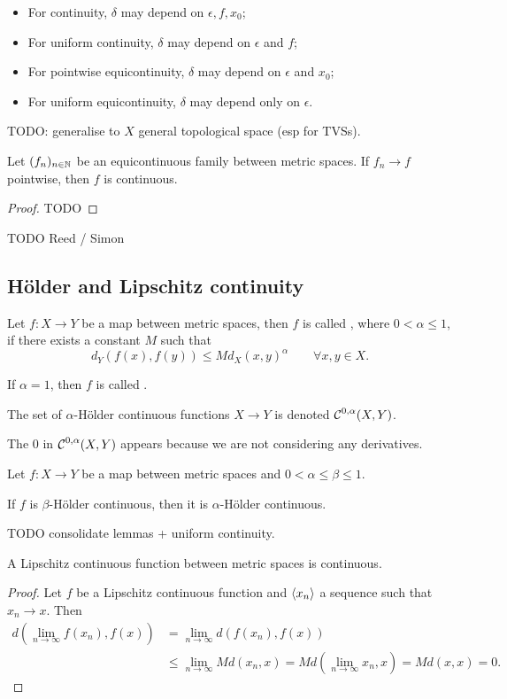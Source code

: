 \begin{itemize}
\item For continuity, $\delta$ may depend on $\epsilon,f,x_0$;
\item For uniform continuity, $\delta$ may depend on $\epsilon$ and $f$;
\item For pointwise equicontinuity, $\delta$ may depend on $\epsilon$ and $x_0$;
\item For uniform equicontinuity, $\delta$ may depend only on $\epsilon$.
\end{itemize}

TODO: generalise to $X$ general topological space (esp for TVSs).

\begin{proposition}
Let $(f_n)_{n\in\mathbb{N}}$ be an equicontinuous family between metric spaces. If $f_n\to f$ pointwise, then $f$ is continuous.
\end{proposition}
\begin{proof}
TODO
\end{proof}

TODO Reed / Simon

\subsection{Hölder and Lipschitz continuity}
\begin{definition}
Let $f: X\to Y$ be a map between metric spaces, then $f$ is called , where $0 < \alpha \leq 1$, if there exists a constant $M$ such that
\[ d_Y(f(x), f(y)) \leq M d_X(x,y)^\alpha \qquad \forall x,y\in X. \]

If $\alpha = 1$, then $f$ is called .

The set of $\alpha$-Hölder continuous functions $X\to Y$ is denoted $\operatorname{\mathcal{C}}^{0,\alpha}(X,Y)$.
\end{definition}
The $0$ in $\operatorname{\mathcal{C}}^{0,\alpha}(X,Y)$ appears because we are not considering any derivatives.

\begin{lemma} \label{HolderLipschitzContinuity}
Let $f: X\to Y$ be a map between metric spaces and $0<\alpha \leq \beta \leq 1$.

If $f$ is $\beta$-Hölder continuous, then it is $\alpha$-Hölder continuous.
\end{lemma}
TODO consolidate lemmas + uniform continuity.
\begin{lemma} \label{LipschitzcontinuousContinuous}
A Lipschitz continuous function between metric spaces is continuous.
\end{lemma}
\begin{proof}
    Let $f$ be a Lipschitz continuous function and $\left\langle x_n \right\rangle$ a sequence such that $x_n \to x$. Then
    \begin{align*}
        d\left(\lim_{n\to\infty}f(x_n), f(x)\right) &= \lim_{n\to\infty}d(f(x_n), f(x)) \\
        &\leq \lim_{n\to\infty}M d(x_n, x) = M d\left(\lim_{n\to\infty}x_n, x\right) = M d(x,x) = 0. 
    \end{align*} 
\end{proof}


